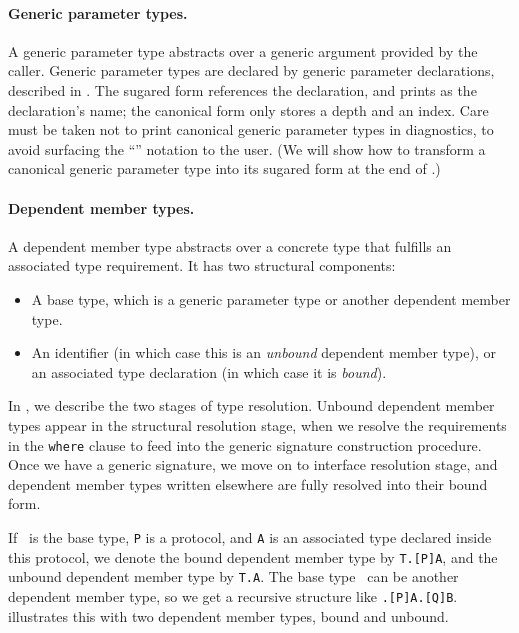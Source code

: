 \documentclass[../generics]{subfiles}
\begin{document}
\paragraph{Generic parameter types.} A generic parameter type abstracts over a generic argument provided by the caller. Generic parameter types are declared by generic parameter declarations, described in . The sugared form references the declaration, and prints as the declaration's name; the canonical form only stores a depth and an index. Care must be taken not to print canonical generic parameter types in diagnostics, to avoid surfacing the ``'' notation to the user. (We will show how to transform a canonical generic parameter type into its sugared form at the end of .)

\paragraph{Dependent member types.}
A dependent member type abstracts over a concrete type that fulfills an associated type requirement. It has two structural components:
\begin{itemize}
\item A base type, which is a generic parameter type or another dependent member type.
\item An identifier (in which case this is an \emph{unbound} dependent member type), or an associated type declaration (in which case it is \emph{bound}).
\end{itemize}

In , we describe the two stages of type resolution. Unbound dependent member types appear in the structural resolution stage, when we resolve the requirements in the \texttt{where} clause to feed into the generic signature construction procedure. Once we have a generic signature, we move on to interface resolution stage, and dependent member types written elsewhere are fully resolved into their bound form.

If \tT\ is the base type, \texttt{P} is a protocol, and \texttt{A} is an associated type declared inside this protocol, we denote the bound dependent member type by \texttt{T.[P]A}, and the unbound dependent member type by \texttt{T.A}. The base type \tT\ can be another dependent member type, so we get a recursive structure like \texttt{.[P]A.[Q]B}.  illustrates this with two dependent member types, bound and unbound.
\end{document}
